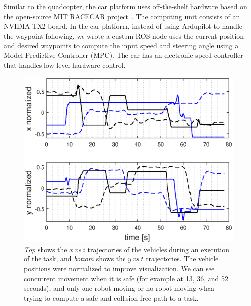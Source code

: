Similar to the quadcopter, the car platform uses off-the-shelf hardware based on the open-source MIT RACECAR project~\cite{MIT_RACECAR}.
The computing unit consists of an NVIDIA TX2 board.
In the car platform, instead of using Ardupilot to handle the waypoint following, we wrote a custom ROS node uses the current position and desired waypoints to compute the input speed and steering angle using a Model Predictive Controller (MPC).
The car has an electronic speed controller that handles low-level hardware control.
\begin{figure}[ht] 
 \centering
  \includegraphics[scale=0.5]{figs/xyvst_norm.eps}
  
  \caption{\small \emph{Top} shows the $x\ vs\ t$ trajectories of the vehicles during an execution of the task, and \emph{bottom} shows the $y\ vs\ t$ trajectories. The vehicle positions were normalized to improve visualization. We can see concurrent movement when it is safe (for example at 13, 36, and 52 seconds), and only one robot moving or no robot moving when trying to compute a safe and collision-free path to a task.  }
  \label{fig:taskdepl}
  \end{figure}
